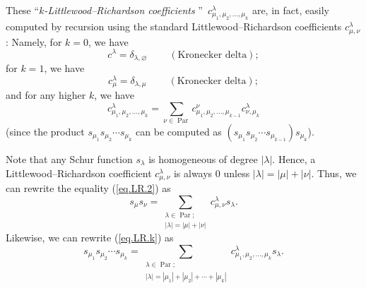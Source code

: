 \documentclass[numbers=enddot,12pt,final,onecolumn,notitlepage]{scrartcl}%
\theoremstyle{definition}
\let\sumnonlimits\sum
\renewcommand{\sum}{\sumnonlimits\limits}
\begin{document}
These \textquotedblleft$k$\emph{-Littlewood--Richardson coefficients}%
\textquotedblright\ $c_{\mu_{1},\mu_{2},\ldots,\mu_{k}}^{\lambda}$ are, in
fact, easily computed by recursion using the standard Littlewood--Richardson
coefficients $c_{\mu,\nu}^{\lambda}$: Namely, for $k=0$, we have%
\[
c^{\lambda}=\delta_{\lambda,\varnothing}\ \ \ \ \ \ \ \ \ \ \left(
\text{Kronecker delta}\right)  ;
\]
for $k=1$, we have%
\[
c_{\mu}^{\lambda}=\delta_{\lambda,\mu}\ \ \ \ \ \ \ \ \ \ \left(
\text{Kronecker delta}\right)  ;
\]
and for any higher $k$, we have%
\[
c_{\mu_{1},\mu_{2},\ldots,\mu_{k}}^{\lambda}=\sum_{\nu\in\operatorname*{Par}%
}c_{\mu_{1},\mu_{2},\ldots,\mu_{k-1}}^{\nu}c_{\nu,\mu_{k}}^{\lambda}%
\]
(since the product $s_{\mu_{1}}s_{\mu_{2}}\cdots s_{\mu_{k}}$ can be computed
as $\left(  s_{\mu_{1}}s_{\mu_{2}}\cdots s_{\mu_{k-1}}\right)  s_{\mu_{k}}$).

Note that any Schur function $s_{\lambda}$ is homogeneous of degree
$\left\vert \lambda\right\vert $. Hence, a Littlewood--Richardson coefficient
$c_{\mu,\nu}^{\lambda}$ is always $0$ unless $\left\vert \lambda\right\vert
=\left\vert \mu\right\vert +\left\vert \nu\right\vert $. Thus, we can rewrite
the equality (\ref{eq.LR.2}) as%
\begin{equation}
s_{\mu}s_{\nu}=\sum_{\substack{\lambda\in\operatorname*{Par};\\\left\vert
\lambda\right\vert =\left\vert \mu\right\vert +\left\vert \nu\right\vert
}}c_{\mu,\nu}^{\lambda}s_{\lambda}. \label{eq.LR.2n}%
\end{equation}
Likewise, we can rewrite (\ref{eq.LR.k}) as%
\begin{equation}
s_{\mu_{1}}s_{\mu_{2}}\cdots s_{\mu_{k}}=\sum_{\substack{\lambda
\in\operatorname*{Par};\\\left\vert \lambda\right\vert =\left\vert \mu
_{1}\right\vert +\left\vert \mu_{2}\right\vert +\cdots+\left\vert \mu
_{k}\right\vert }}c_{\mu_{1},\mu_{2},\ldots,\mu_{k}}^{\lambda}s_{\lambda}.
\label{eq.LR.kn}%
\end{equation}
\end{document}
